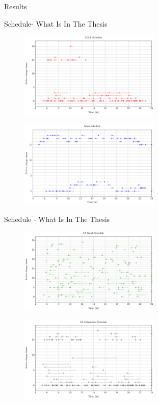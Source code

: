\documentclass[aspectratio=169]{beamer}
\begin{document}
\begin{frame}[label={sec:org4ee59dd}]{Results}
\begin{frame}[label={sec:org636a468}]{Schedule- What Is In The Thesis}
\begin{figure}[htpb]
\centering
    \includegraphics[width=0.6\textwidth]{img/sa-pap-paper-bad/schedule-milp}
\end{figure}
\begin{figure}[htpb]
\centering
    \includegraphics[width=0.6\textwidth]{img/sa-pap-paper-bad/schedule-quinn}
\end{figure}
\end{frame}

\begin{frame}[label={sec:org77bf612}]{Schedule - What Is In The Thesis}
\begin{figure}[htpb]
\centering
    \includegraphics[width=0.6\textwidth]{img/sa-pap-paper-bad/schedule-sa-quick}
\end{figure}
\begin{figure}[htpb]
\centering
    \includegraphics[width=0.6\textwidth]{img/sa-pap-paper-bad/schedule-sa-heuristic}
\end{figure}
\end{frame}


\end{frame}
\end{document}
